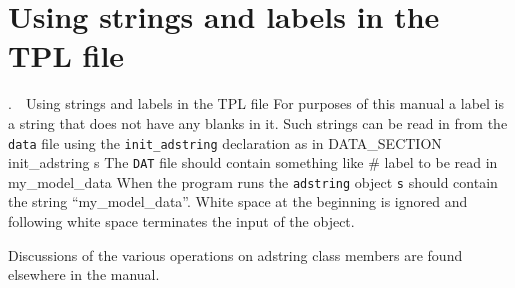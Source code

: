 \documentclass[12pt]{book}
\makeatletter
\def\mysection#1{\section{#1}{\bigbf \medbreak\noindent\number\c@chapter.\number\c@section\ \ #1\medbreak}}
\makeatother
\begin{document}
\htmlnewfile
{}
 
\endchapter


\htmlnewfile
{}
 
\endchapter

\htmlnewfile
{}

\endchapter
\htmlnewfile
{}

\htmlnewfile
{} 

\endchapter
\htmlnewfile
{}
 
\endchapter
\htmlnewfile
{}

\endchapter
\htmlnewfile
%

\htmlnewfile
{}

\endchapter

%

%  

\htmlnewfile
{}
 
\endchapter

\htmlnewfile
{}

\endchapter
\htmlnewfile
\mysection{Using strings and labels in the TPL file}
For purposes of this manual a label is a string that does not
have any blanks in it. Such strings can be read in from the
{\tt data} file using the {\tt init\_adstring} declaration
as in
\beginexample
  DATA_SECTION
    init_adstring s
\endexample
The {\tt DAT} file should contain something like
\beginexample
  # label to be read in
    my_model_data   
\endexample
\noindent When the program runs the {\tt adstring} object {\tt s}
should contain the string ``my\_model\_data''. White space at
the beginning is ignored and following white space terminates
the input of the object.

Discussions of the various
operations on adstring class members are found elsewhere in the
manual.
\end{document}
